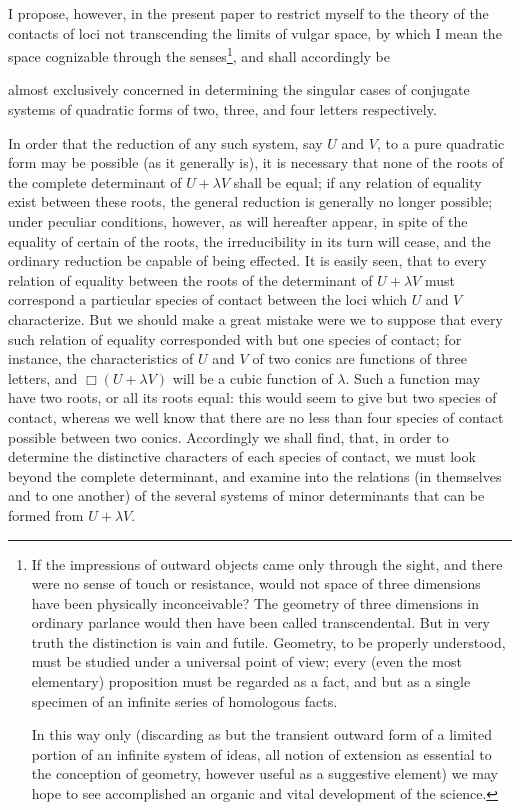 \documentclass[11pt]{article}
\newcommand{\sourcepage}[1]{\marginpar{\scriptsize p.~#1}}
\begin{document}
{{I propose, however, in the present paper to restrict myself to the theory of the contacts of loci not transcending the limits of vulgar space, by which I mean the space cognizable through the senses\footnote{If the impressions of outward objects came only through the sight, and there were no sense of touch or resistance, would not space of three dimensions have been physically inconceivable? The geometry of three dimensions in ordinary parlance would then have been called transcendental. But in very truth the distinction is vain and futile. Geometry, to be properly understood, must be studied under a universal point of view; every (even the most elementary) proposition must be regarded as a fact, and but as a single specimen of an infinite series of homologous facts.

In this way only (discarding as but the transient outward form of a limited portion of an infinite system of ideas, all notion of extension as essential to the conception of geometry, however useful as a suggestive element) we may hope to see accomplished an organic and vital development of the science.}, and shall accordingly be

\sourcepage{220}
almost exclusively concerned in determining the singular cases of conjugate systems of quadratic forms of two, three, and four letters respectively.

In order that the reduction of any such system, say $U$ and $V$, to a pure quadratic form may be possible (as it generally is), it is necessary that none of the roots of the complete determinant of $U+\lambda V$ shall be equal; if any relation of equality exist between these roots, the general reduction is generally no longer possible; under peculiar conditions, however, as will hereafter appear, in spite of the equality of certain of the roots, the irreducibility in its turn will cease, and the ordinary reduction be capable of being effected. It is easily seen, that to every relation of equality between the roots of the determinant of $U+\lambda V$ must correspond a particular species of contact between the loci which $U$ and $V$ characterize. But we should make a great mistake were we to suppose that every such relation of equality corresponded with but one species of contact; for instance, the characteristics of $U$ and $V$ of two conics are functions of three letters, and $\Box(U+\lambda V)$ will be a cubic function of $\lambda$. Such a function may have two roots, or all its roots equal: this would seem to give but two species of contact, whereas we well know that there are no less than four species of contact possible between two conics. Accordingly we shall find, that, in order to determine the distinctive characters of each species of contact, we must look beyond the complete determinant, and examine into the relations (in themselves and to one another) of the several systems of minor determinants that can be formed from $U+\lambda V$.

}}
\end{document}
